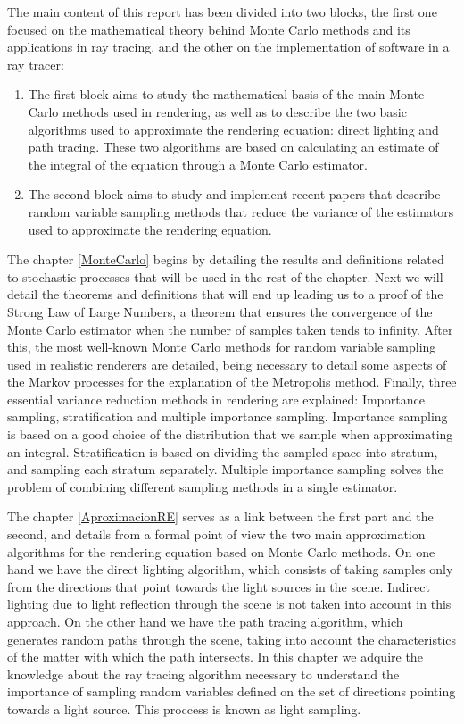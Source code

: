 The main content of this report has been divided into two blocks, the first one focused on the mathematical theory behind Monte Carlo methods and its applications in ray tracing, and the other on the implementation of software in a ray tracer:
\begin{enumerate}
\item The first block aims to study the mathematical basis of the main Monte Carlo methods used in rendering, as well as to describe the two basic algorithms used to approximate the rendering equation: direct lighting and path tracing. These two algorithms are based on calculating an estimate of the integral of the equation through a Monte Carlo estimator.
\item The second block aims to study and implement recent papers that describe random variable sampling methods that reduce the variance of the estimators used to approximate the rendering equation.
\end{enumerate}

The chapter \ref{MonteCarlo} begins by detailing the results and definitions related to stochastic processes that will be used in the rest of the chapter. Next we will detail the theorems and definitions that will end up leading us to a proof of the Strong Law of Large Numbers, a theorem that ensures the convergence of the Monte Carlo estimator when the number of samples taken tends to infinity. After this, the most well-known Monte Carlo methods for random variable sampling used in realistic renderers are detailed, being necessary to detail some aspects of the Markov processes for the explanation of the Metropolis method. Finally, three essential variance reduction methods in rendering are explained: Importance sampling, stratification and multiple importance sampling. Importance sampling is based on a good choice of the distribution that we sample when approximating an integral. Stratification is based on dividing the sampled space into stratum, and sampling each stratum separately. Multiple importance sampling solves the problem of combining different sampling methods in a single estimator.

The chapter \ref{AproximacionRE} serves as a link between the first
part and the second, and details from a formal point of view the two
main approximation algorithms for the rendering equation based on Monte Carlo methods.  On one hand we have the direct lighting algorithm, which consists of taking samples only from the directions that point towards the light sources in the scene. Indirect lighting due to light reflection through the scene is not taken into account in this approach. On the other hand we have the path tracing algorithm, which generates random paths through the scene, taking into account the characteristics of the matter with which the path intersects.
In this chapter we adquire the knowledge about the ray tracing algorithm
necessary to understand the importance of sampling random variables 
defined on the set of directions pointing towards
a light source. This proccess is known as light sampling.


